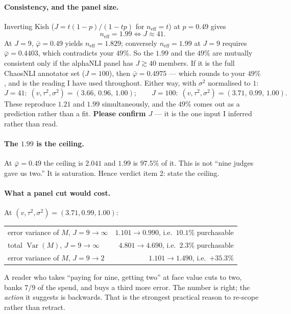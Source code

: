 \documentclass[11pt]{article}
\theoremstyle{plain}
\theoremstyle{definition}
\theoremstyle{remark}
\newcommand{\Var}{\operatorname{Var}}
\newcommand{\pb}{\bar{\varphi}}
\newcommand{\neff}{n_{\mathrm{eff}}}
\begin{document}
\paragraph{Consistency, and the panel size.} Inverting Kish ($J=t(1-p)/(1-tp)$ for
$\neff=t$) at $p=0.49$ gives
\[
\neff=1.99 \iff J\approx 41 .
\]
At $J=9$, $\pb=0.49$ yields $\neff=1.829$; conversely $\neff=1.99$ at $J=9$ requires
$\pb=0.4403$, which contradicts your $49\%$. So the $1.99$ and the $49\%$ are mutually consistent
only if the alphaNLI panel has $J\gtrsim40$ members. If it is the full ChaosNLI annotator set
($J=100$), then $\pb=0.4975$ --- which rounds to your $49\%$, and is the reading I have used
throughout. Either way, with $\sigma^2$ normalised to $1$:
\[
J=41:\;(v,\tau^2,\sigma^2)=(3.66,\,0.96,\,1.00);\qquad
J=100:\;(v,\tau^2,\sigma^2)=(3.71,\,0.99,\,1.00).
\]
These reproduce $1.21$ and $1.99$ simultaneously, and the $49\%$ comes out as a prediction rather
than a fit. \textbf{Please confirm $J$} --- it is the one input I inferred rather than read.

\paragraph{The $1.99$ is the ceiling.} At $\pb=0.49$ the ceiling is $2.041$ and $1.99$ is
$97.5\%$ of it. This is not ``nine judges gave us two.'' It is saturation. Hence verdict item 2:
state the ceiling.

\paragraph{What a panel cut would cost.} At $(v,\tau^2,\sigma^2)=(3.71,0.99,1.00)$:
\begin{center}
\begin{tabular}{@{}lr@{}}
\toprule
error variance of $M$, $J=9\to\infty$ & $1.101\to0.990$, i.e.\ $10.1\%$ purchasable \\
total $\Var(M)$, $J=9\to\infty$       & $4.801\to4.690$, i.e.\ $2.3\%$ purchasable \\
error variance of $M$, $J=9\to2$      & $1.101\to1.490$, i.e.\ $\mathbf{+35.3\%}$ \\
\bottomrule
\end{tabular}
\end{center}
A reader who takes ``paying for nine, getting two'' at face value cuts to two, banks $7/9$ of the
spend, and buys a third more error. The number is right; the \emph{action} it suggests is
backwards. That is the strongest practical reason to re-scope rather than retract.
\end{document}
